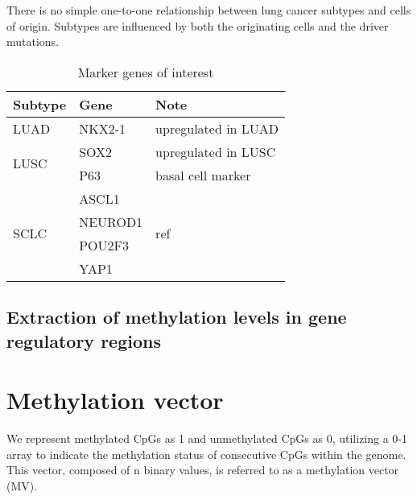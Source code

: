 \documentclass[12pt,letterpaper]{article}
\begin{document}
There is no simple one-to-one relationship between lung cancer subtypes and cells of origin. Subtypes are
influenced by both the originating cells and the driver mutations\cite{ferone_cells_2020}.

\begin{table}[H]
    \begin{center}
        \caption{ Marker genes of interest}
        \begin{tabular}{|l|l|l|}
            \hline
            \textbf{Subtype}      & \textbf{Gene} & \textbf{Note}                              \\
            \hline
            LUAD                  & NKX2-1        & upregulated in LUAD                        \\
            \hline
            \multirow{2}{*}{LUSC} & SOX2          & upregulated in LUSC                        \\
            \cline{2-3}           & P63           & basal cell marker                          \\
            \hline
            \multirow{4}{*}{SCLC} & ASCL1         & \multirow{4}{*}{ref\cite{baine_sclc_2020}} \\
            \cline{2-2}           & NEUROD1       &                                            \\
            \cline{2-2}           & POU2F3        &                                            \\
            \cline{2-2}           & YAP1          &                                            \\
            \hline
        \end{tabular}
    \end{center}
    \label{tab:gene-marker}
\end{table}
\subsection{Extraction of methylation levels in gene regulatory regions}\label{sec:gene-methylation}

\section{Methylation vector}\label{sec:vector}

We represent methylated CpGs as 1 and unmethylated CpGs as 0, utilizing a 
0-1 array to indicate the methylation status of consecutive CpGs within the 
genome. This vector, composed of n binary values, is referred to as a 
methylation vector (MV).
\end{document}
